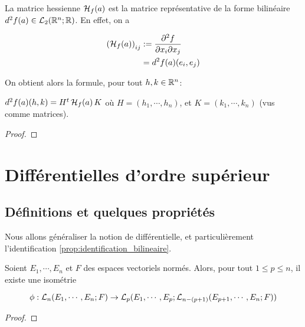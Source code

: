 La matrice hessienne $\hessienneMatrix{f}{a}$ est la matrice représentative de
la forme bilinéaire $d^{2}f (a) \in \GScontinueHomo[2]{\real^{n}}{\real}$.
En effet, on a

\begin{align*}
	\left(\hessienneMatrix{f}{a}\right)_{ij} & := \pdv{f}{x_{i}}{x_{j}} (a) \\
								& = d^{2}f (a) (e_{i}, e_{j})
\end{align*}

On obtient alors la formule, pour tout $h, k \in \real^{n}$:

\begin{proposition}
	$d^{2}f(a)(h, k) = H^{t} \, \hessienneMatrix{f}{a} \, K$
	où $H = (h_{1}, \cdots, h_{n})$, et $K = (k_{1}, \cdots, k_{n})$ (vus comme
	matrices).
\end{proposition}

\ifdefined\outputproof
\begin{proof}

\end{proof}
\fi

\section{Différentielles d'ordre supérieur}

\subsection{Définitions et quelques propriétés}

Nous allons généraliser la notion de différentielle, et particulièrement
l'identification \ref{prop:identification_bilineaire}.

\begin{proposition}
	Soient $E_{1}, \cdots, E_{n}$ et $F$ des espaces vectoriels normés.
	Alors, pour tout $1 \leq p \leq n$, il existe une isométrie

	\begin{equation*}
		\phi : \GScontinueHomo[n]{E_{1}, \cdots, E_{n}}{F} \rightarrow
		\GScontinueHomo[p]{E_{1}, \cdots, E_{p}}{\GScontinueHomo[n - (p + 1)]{E_{p + 1}, \cdots,
		E_{n}}{F}}
	\end{equation*}
\end{proposition}

\ifdefined\outputproof
\begin{proof}

\end{proof}
\fi

